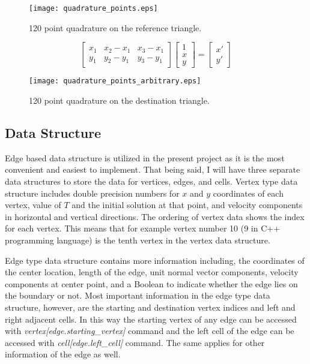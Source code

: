 \documentclass{article}
\begin{document}
\begin{figure}[H]
\centering
\texttt{[image: quadrature\_points.eps]}
\caption{120 point quadrature on the reference triangle.}
\label{fig_quadrature_points_1}
\end{figure}

\begin{equation}
\label{eq_linear_mapping_2}
\left[
\begin{matrix}
x_1 & x_2-x_1 & x_3-x_1 \\
y_1 & y_2-y_1 & y_3-y_1
\end{matrix}
\right]\left[
\begin{matrix}
1 \\
x \\
y
\end{matrix}
\right]=\left[
\begin{matrix}
x' \\
y'
\end{matrix}
\right]
\end{equation}

\begin{figure}[H]
\centering
\texttt{[image: quadrature\_points\_arbitrary.eps]}
\caption{120 point quadrature on the destination triangle.}
\label{fig_quadrature_points_2}
\end{figure}


\subsection{Data Structure}
Edge based data structure is utilized in the present project as it is the most convenient and easiest to implement. That being said, I will have three separate data structures to store the data for vertices, edges, and cells. Vertex type data structure includes double precision numbers for $x$ and $y$ coordinates of each vertex, value of $T$ and the initial solution at that point, and velocity components in horizontal and vertical directions. The ordering of vertex data shows the index for each vertex. This means that for example vertex number 10 (9 in C++ programming language) is the tenth vertex in the vertex data structure.

Edge type data structure contains more information including, the coordinates of the center location, length of the edge, unit normal vector components, velocity components at center point, and a Boolean to indicate whether the edge lies on the boundary or not. Most important information in the edge type data structure, however, are the starting and destination vertex indices and left and right adjacent cells. In this way the starting vertex of any edge can be accessed with \textit{vertex[edge.starting\_vertex]} command and the left cell of the edge can be accessed with \textit{cell[edge.left\_cell]} command. The same applies for other information of the edge as well.
\end{document}
